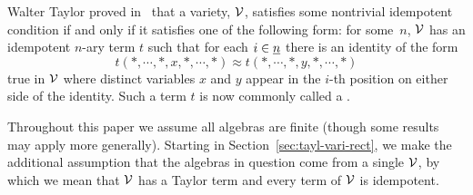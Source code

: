Walter Taylor proved in~\cite{MR0434928} that a variety, $\mathcal{V}$, satisfies some
nontrivial idempotent \malcev condition if and only if it satisfies one of the following
form: for some~$n$, $\mathcal{V}$ has an idempotent $n$-ary term  $t$ such that
for each $i\in \underline{n}$ there is an identity of the form
\[
t(\ast, \cdots, \ast, x, \ast, \cdots, \ast) \approx t(\ast, \cdots, \ast, y,
\ast, \cdots, \ast)
\]
true in $\mathcal{V}$ where distinct variables $x$ and $y$ appear in the
$i$-th position on either side of the identity.  Such a term $t$ is now commonly
called a . 


Throughout this paper we assume all algebras are finite 
(though some results may apply more generally).
Starting in Section~\ref{sec:tayl-vari-rect},
we make the additional assumption that the algebras in
question come from a single  $\mathcal{V}$, by which we mean that $\mathcal{V}$
has a Taylor term and every term of $\mathcal{V}$ is idempotent.

